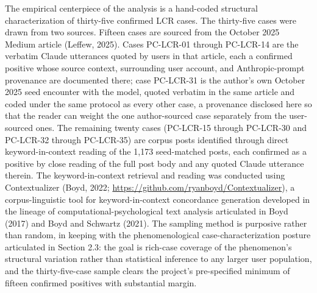 \documentclass[11pt]{article}
\begin{document}
The empirical centerpiece of the analysis is a hand-coded structural characterization of thirty-five confirmed LCR cases. The thirty-five cases were drawn from two sources. Fifteen cases are sourced from the October 2025 Medium article (Leffew, 2025). Cases PC-LCR-01 through PC-LCR-14 are the verbatim Claude utterances quoted by users in that article, each a confirmed positive whose source context, surrounding user account, and Anthropic-prompt provenance are documented there; case PC-LCR-31 is the author's own October 2025 seed encounter with the model, quoted verbatim in the same article and coded under the same protocol as every other case, a provenance disclosed here so that the reader can weight the one author-sourced case separately from the user-sourced ones. The remaining twenty cases (PC-LCR-15 through PC-LCR-30 and PC-LCR-32 through PC-LCR-35) are corpus posts identified through direct keyword-in-context reading of the 1,173 seed-matched posts, each confirmed as a positive by close reading of the full post body and any quoted Claude utterance therein. The keyword-in-context retrieval and reading was conducted using Contextualizer (Boyd, 2022; \url{https://github.com/ryanboyd/Contextualizer}), a corpus-linguistic tool for keyword-in-context concordance generation developed in the lineage of computational-psychological text analysis articulated in Boyd (2017) and Boyd and Schwartz (2021). The sampling method is purposive rather than random, in keeping with the phenomenological case-characterization posture articulated in Section 2.3: the goal is rich-case coverage of the phenomenon's structural variation rather than statistical inference to any larger user population, and the thirty-five-case sample clears the project's pre-specified minimum of fifteen confirmed positives with substantial margin.
\end{document}
